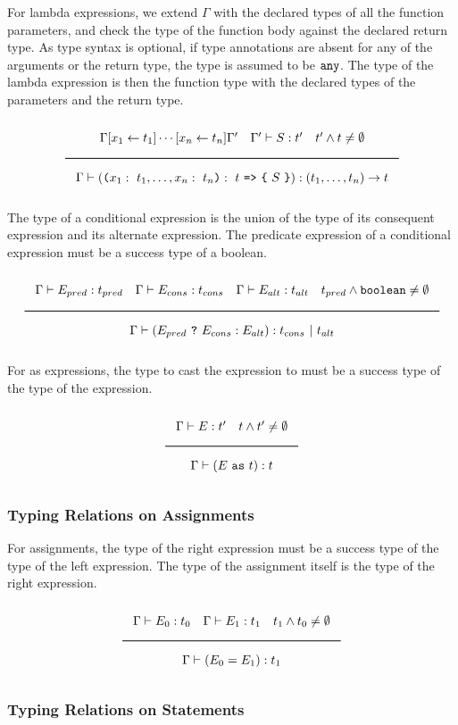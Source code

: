 For lambda expressions, we extend $\Gamma$ with the declared types of all the function parameters,
and check the type of the function body against the declared return type.
As type syntax is optional, if type annotations are absent for any of the arguments or the return type, the type is assumed to be $\texttt{any}$.
The type of the lambda expression is then the function type with the declared types of the parameters and the return type. 

\noindent
\[
  \Rule{\Gamma [x_1 \leftarrow t_1] \cdots [x_n \leftarrow t_n] \Gamma' \quad \Gamma' \vdash S : t' \quad t' \wedge t \neq \emptyset}{
    \Gamma \vdash ( \Lp  x_1:\ t_1, \ldots, x_n:\ t_n \Rp :\ t\ \texttt{=>}\ \Lc\ S\ \Rc) : (t_1, \ldots, t_n) \rightarrow t}  
\]
\noindent

The type of a conditional expression is the union of the type of its consequent expression and its alternate expression.
The predicate expression of a conditional expression must be a success type of a boolean.

\noindent
\[
  \Rule{\Gamma \vdash E_{pred} : t_{pred} \quad \Gamma \vdash E_{cons} : t_{cons} \quad \Gamma \vdash E_{alt} : t_{alt}
    \quad t_{pred} \wedge \Bool \neq \emptyset}{\Gamma \vdash (E_{pred}\ \texttt{?}\ E_{cons} : E_{alt}) : t_{cons}\ |\ t_{alt}}
\]
\noindent

For as expressions, the type to cast the expression to must be a success type of the type of the expression.

\noindent
\[
  \Rule{\Gamma \vdash E : t' \quad t \wedge t' \neq \emptyset}{\Gamma \vdash (E\ \texttt{as}\ t) : t}  
\]
\noindent

\subsubsection{Typing Relations on Assignments}

For assignments, the type of the right expression must be a success type of the type of the left expression.
The type of the assignment itself is the type of the right expression.

\noindent
\[
  \Rule{\Gamma \vdash E_0 : t_0 \quad \Gamma \vdash E_1 : t_1 \quad t_1 \wedge t_0 \neq \emptyset}{
    \Gamma \vdash (E_0 = E_1) : t_1}
\]
\noindent

\subsubsection{Typing Relations on Statements}


